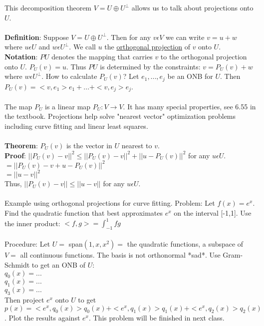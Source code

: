 \documentclass{article}
\begin{document}
This decomposition theorem $V = U \oplus U^{\perp}$ allows us to talk about projections onto $U$. \\\\
\textbf{Definition}: Suppose $V = U \oplus U^{\perp}$. Then for any $v \epsilon V$ we can write $v = u + w$ where $u \epsilon U$ and $w \epsilon U^{\perp}$. We call $u$ the \underline{orthogonal projection} of $v$ onto $U$. \\
\textbf{Notation}: $PU$ denotes the mapping that carries $v$ to the orthogonal projection onto $U$. $P_U(v) = u$. Thus $PU$ is determined by the constraints: $v = P_U(v) + w$ where $ w \epsilon U^{\perp}$. How to calculate $P_U(v)$? Let $e_1, ..., e_j$ be an ONB for $U$. Then $P_U(v) = <v, e_1>e_1 + ... + <v,e_j>e_j$. \\\\
The map $P_U$ is a linear map $P_U: V \rightarrow V$. It has many special properties, see 6.55 in the textbook. Projections help solve "nearest vector" optimization problems including curve fitting and linear least squares. \\\\
\textbf{Theorem}: $P_U(v)$ is the vector in $U$ nearest to $v$. \\
\textbf{Proof}: $||P_U(v) - v||^2 \leq ||P_U(v) - v ||^2 + ||u-P_U(v)||^2$ for any $u \epsilon U$. \\
$= ||P_U(v) - v + u - P_U(v)||^2$\\
$=||u-v||^2$ \\
Thus, $||P_U(v) - v|| \leq ||u-v||$ for any $u \epsilon U$. \\\\
Example using orthogonal projections for curve fitting. Problem: Let $f(x) = e^x$. Find the quadratic function that best approximates $e^x$ on the interval [-1,1]. Use the inner product: $<f,g> = \int_{-1}^{1} fg$ \\\\
Procedure: Let $U = $ span$(1, x, x^2) =$ the quadratic functions, a subspace of $V =$ all continuous functions. The basis is not orthonormal *sad*. Use Gram-Schmidt to get an ONB of $U$: \\
$q_0(x) = ...$\\
$q_1(x) = ... $\\
$q_3(x) = ...$\\
Then project $e^x$ onto $U$ to get $p(x) = <e^x,q_0(x)>q_0(x) + <e^x, q_1(x)>q_1(x) + <e^x, q_2(x)>q_2(x)$. Plot the results against $e^x$. This problem will be finished in next class. 
\end{document}
